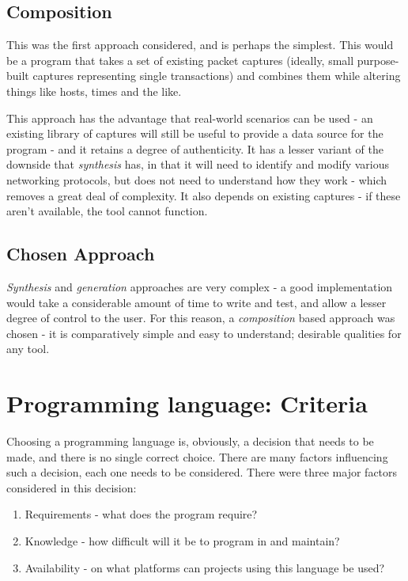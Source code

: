 \documentclass[10pt,a4paper,notitlepage,twoside]{report}
\begin{document}
\subsection{Composition}
This was the first approach considered, and is perhaps the simplest. This would be a program that takes a set of existing packet captures (ideally, small purpose-built captures representing single transactions) and combines them while altering things like hosts, times and the like.

This approach has the advantage that real-world scenarios can be used - an existing library of captures will still be useful to provide a data source for the program - and it retains a degree of authenticity. It has a lesser variant of the downside that \emph{synthesis} has, in that it will need to identify and modify various networking protocols, but does not need to understand how they work - which removes a great deal of complexity. It also depends on existing captures - if these aren't available, the tool cannot function.

\subsection{Chosen Approach}
\emph{Synthesis} and \emph{generation} approaches are very complex - a good implementation would take a considerable amount of time to write and test, and allow a lesser degree of control to the user. For this reason, a \emph{composition} based approach was chosen - it is comparatively simple and easy to understand; desirable qualities for any tool.

\section{Programming language: Criteria}
Choosing a programming language is, obviously, a decision that needs to be made, and there is no single correct choice. There are many factors influencing such a decision, each one needs to be considered. There were three major factors considered in this decision:
\begin{enumerate}[label=\roman*)]
\item Requirements - what does the program require?
\item Knowledge - how difficult will it be to program in and maintain?
\item Availability - on what platforms can projects using this language be used?
\end{enumerate}
\end{document}

